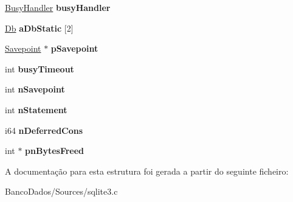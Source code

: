 \begin{DoxyCompactItemize}
\item 
\hypertarget{structsqlite3_a5f50915803efe2ad40dc1a5e31763671}{\hyperlink{struct_busy_handler}{Busy\-Handler} {\bfseries busy\-Handler}}\label{structsqlite3_a5f50915803efe2ad40dc1a5e31763671}

\item 
\hypertarget{structsqlite3_ad99069213dff7fede71447b97d22d710}{\hyperlink{struct_db}{Db} {\bfseries a\-Db\-Static} \mbox{[}2\mbox{]}}\label{structsqlite3_ad99069213dff7fede71447b97d22d710}

\item 
\hypertarget{structsqlite3_a47f4fe21bba981ccd47ee7f873f48a07}{\hyperlink{struct_savepoint}{Savepoint} $\ast$ {\bfseries p\-Savepoint}}\label{structsqlite3_a47f4fe21bba981ccd47ee7f873f48a07}

\item 
\hypertarget{structsqlite3_a69237f7a2b079706c544f09255fd8905}{int {\bfseries busy\-Timeout}}\label{structsqlite3_a69237f7a2b079706c544f09255fd8905}

\item 
\hypertarget{structsqlite3_a51d1dc4f5668dbc2282162bdfdca96ec}{int {\bfseries n\-Savepoint}}\label{structsqlite3_a51d1dc4f5668dbc2282162bdfdca96ec}

\item 
\hypertarget{structsqlite3_a727c6da42aa4313c715de350303c90f6}{int {\bfseries n\-Statement}}\label{structsqlite3_a727c6da42aa4313c715de350303c90f6}

\item 
\hypertarget{structsqlite3_a1d74627daa6fe93811e99cffe9362c10}{i64 {\bfseries n\-Deferred\-Cons}}\label{structsqlite3_a1d74627daa6fe93811e99cffe9362c10}

\item 
\hypertarget{structsqlite3_a5559fb199b06ee59b635bb18f153fcf8}{int $\ast$ {\bfseries pn\-Bytes\-Freed}}\label{structsqlite3_a5559fb199b06ee59b635bb18f153fcf8}

\end{DoxyCompactItemize}


A documentação para esta estrutura foi gerada a partir do seguinte ficheiro\-:\begin{DoxyCompactItemize}
\item 
Banco\-Dados/\-Sources/sqlite3.\-c\end{DoxyCompactItemize}
